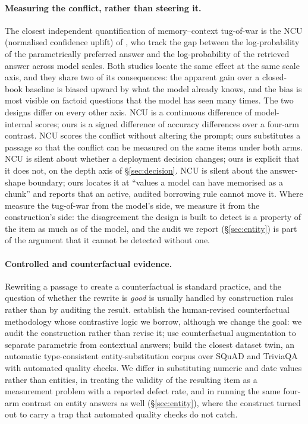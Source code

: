\documentclass[11pt]{article}
\begin{document}
\paragraph{Measuring the conflict, rather than steering it.}
The closest independent quantification of memory--context tug-of-war is the NCU
(normalised confidence uplift) of \citet{prior_dominance}, who track the gap between the
log-probability of the parametrically preferred answer and the log-probability of the
retrieved answer across model scales.
Both studies locate the same effect at the same scale axis, and they share two of its
consequences: the apparent gain over a closed-book baseline is biased upward by what the
model already knows, and the bias is most visible on factoid questions that the model has
seen many times.
The two designs differ on every other axis. NCU is a continuous difference of
model-internal scores; ours is a signed difference of accuracy differences over a
four-arm contrast. NCU scores the conflict without altering the
prompt; ours substitutes a passage so that the conflict can be measured on the same items
under both arms. NCU is silent about whether a deployment decision changes; ours is explicit
that it does not, on the depth axis of \S\ref{sec:decision}. NCU is silent about the
answer-shape boundary; ours locates it at ``values a model can have memorised as a chunk''
and reports that an active, audited borrowing rule cannot move it.
Where \citet{prior_dominance} measure the tug-of-war from the model's side, we measure it
from the construction's side: the disagreement the design is built to detect is a property
of the item as much as of the model, and the audit we report (\S\ref{sec:entity}) is part
of the argument that it cannot be detected without one.

\paragraph{Controlled and counterfactual evidence.}
Rewriting a passage to create a counterfactual is standard practice, and the question of
whether the rewrite is \emph{good} is usually handled by construction rules rather than by
auditing the result. \citet{kaushik2020counterfactual} establish the human-revised
counterfactual methodology whose contrastive logic we borrow, although we change the goal:
we audit the construction rather than revise it; \citet{neeman2023disentqa} use
counterfactual augmentation to separate parametric
from contextual answers; \citet{ju2026faithfulnessqa} build the closest dataset twin, an
automatic type-consistent entity-substitution corpus over {SQuAD} and {TriviaQA} with
automated quality checks. We differ in substituting numeric and date values rather than
entities, in treating the validity of the resulting item as a measurement problem with a
reported defect rate, and in running the same four-arm contrast on entity answers as well
(\S\ref{sec:entity}), where the construct turned out to carry a trap that automated quality
checks do not catch.
\end{document}
